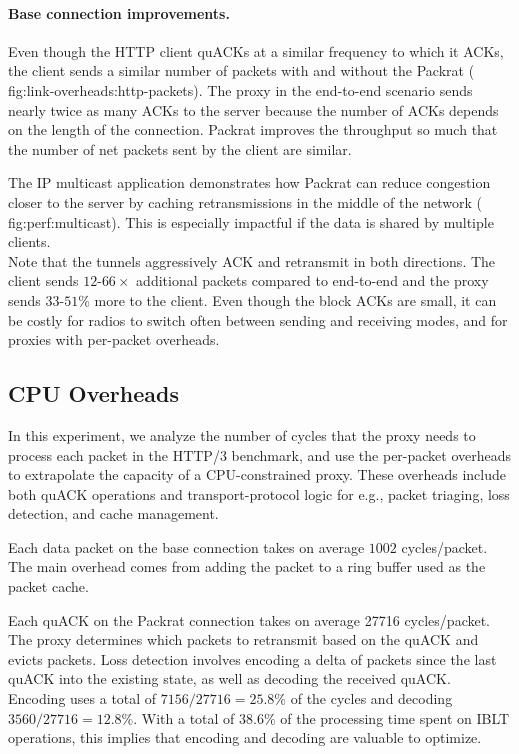 \paragraph{Base connection improvements.}

Even though the HTTP client quACKs at a similar frequency to which it ACKs, the
client sends a similar number of packets with and without the Packrat (\Cref
{fig:link-overheads:http-packets}). The proxy in the end-to-end scenario sends
nearly twice as many ACKs to the server because the number of ACKs depends on
the length of the connection. Packrat improves the throughput so much that the
number of net packets sent by the client are similar.

The IP multicast application demonstrates how Packrat can reduce congestion closer
to the server by caching retransmissions in the middle of the network (\Cref
{fig:perf:multicast}). This is especially impactful if the data is shared by
multiple clients.\\

\noindent Note that the tunnels aggressively ACK and retransmit in both
directions. The client sends $12$-$66\!\times$ additional packets compared to
end-to-end and the proxy sends $33$-$51$\% more to the client. Even though the
block ACKs are small, it can be costly for radios to switch often between
sending and receiving modes, and for proxies with per-packet overheads.

\subsection{CPU Overheads}

In this experiment, we analyze the number of cycles that the proxy
needs to process each
packet in the HTTP/3 benchmark, and use the per-packet overheads to
extrapolate the capacity of a CPU-constrained proxy. These overheads
include both quACK operations and transport-protocol logic for e.g.,
packet triaging, loss detection, and cache management.

Each data packet on the base connection takes on average $1002$ cycles/packet.
The main overhead comes from adding the packet to a ring buffer used as the
packet cache.

Each quACK on the Packrat connection takes on average 27716 cycles/packet. The
proxy determines which packets to retransmit based on the quACK and evicts
packets. Loss detection involves encoding a delta of packets since the last
quACK into the existing state, as well as decoding the received quACK. Encoding
uses a total of $7156/27716 = 25.8\%$ of the cycles and decoding $3560/27716 =
12.8\%$. With a total of $38.6\%$ of the processing time spent on IBLT
operations, this implies that encoding and decoding are valuable to optimize.

